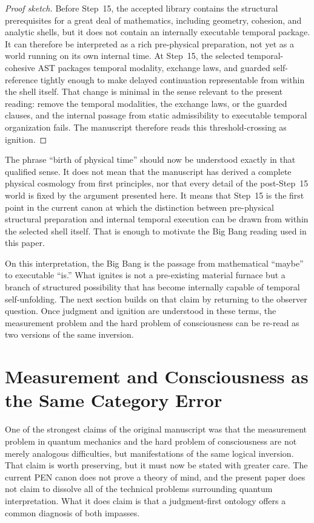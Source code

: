 \documentclass[11pt,a4paper]{article}
\theoremstyle{plain}
\theoremstyle{definition}
\theoremstyle{remark}
\begin{document}
\begin{proof}[Proof sketch]
Before Step~15, the accepted library contains the structural prerequisites for a great deal of mathematics, including geometry, cohesion, and analytic shells, but it does not contain an internally executable temporal package.
It can therefore be interpreted as a rich pre-physical preparation, not yet as a world running on its own internal time.
At Step~15, the selected temporal-cohesive AST packages temporal modality, exchange laws, and guarded self-reference tightly enough to make delayed continuation representable from within the shell itself.
That change is minimal in the sense relevant to the present reading: remove the temporal modalities, the exchange laws, or the guarded clauses, and the internal passage from static admissibility to executable temporal organization fails.
The manuscript therefore reads this threshold-crossing as ignition.
\end{proof}

The phrase ``birth of physical time'' should now be understood exactly in that qualified sense.
It does not mean that the manuscript has derived a complete physical cosmology from first principles, nor that every detail of the post-Step~15 world is fixed by the argument presented here.
It means that Step~15 is the first point in the current canon at which the distinction between pre-physical structural preparation and internal temporal execution can be drawn from within the selected shell itself.
That is enough to motivate the Big Bang reading used in this paper.

On this interpretation, the Big Bang is the passage from mathematical ``maybe'' to executable ``is.''
What ignites is not a pre-existing material furnace but a branch of structured possibility that has become internally capable of temporal self-unfolding.
The next section builds on that claim by returning to the observer question.
Once judgment and ignition are understood in these terms, the measurement problem and the hard problem of consciousness can be re-read as two versions of the same inversion.

\section{Measurement and Consciousness as the Same Category Error}
\label{sec:paradoxes}

One of the strongest claims of the original manuscript was that the measurement problem in quantum mechanics and the hard problem of consciousness are not merely analogous difficulties, but manifestations of the same logical inversion.
That claim is worth preserving, but it must now be stated with greater care.
The current PEN canon does not prove a theory of mind, and the present paper does not claim to dissolve all of the technical problems surrounding quantum interpretation.
What it does claim is that a judgment-first ontology offers a common diagnosis of both impasses.
\end{document}
